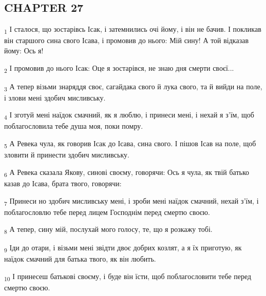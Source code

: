 \subsection{CHAPTER 27}
\begin{tcolorbox}
\textsubscript{1} І сталося, що зостарівсь Ісак, і затемнились очі йому, і він не бачив. І покликав він старшого сина свого Ісава, і промовив до нього: Мій сину! А той відказав йому: Ось я!
\end{tcolorbox}
\begin{tcolorbox}
\textsubscript{2} І промовив до нього Ісак: Оце я зостарівся, не знаю дня смерти своєї...
\end{tcolorbox}
\begin{tcolorbox}
\textsubscript{3} А тепер візьми знаряддя своє, сагайдака свого й лука свого, та й вийди на поле, і злови мені здобич мисливську.
\end{tcolorbox}
\begin{tcolorbox}
\textsubscript{4} І зготуй мені наїдок смачний, як я люблю, і принеси мені, і нехай я з'їм, щоб поблагословила тебе душа моя, поки помру.
\end{tcolorbox}
\begin{tcolorbox}
\textsubscript{5} А Ревека чула, як говорив Ісак до Ісава, сина свого. І пішов Ісав на поле, щоб зловити й принести здобич мисливську.
\end{tcolorbox}
\begin{tcolorbox}
\textsubscript{6} А Ревека сказала Якову, синові своєму, говорячи: Ось я чула, як твій батько казав до Ісава, брата твого, говорячи:
\end{tcolorbox}
\begin{tcolorbox}
\textsubscript{7} Принеси но здобич мисливську мені, і зроби мені наїдок смачний, нехай з'їм, і поблагословлю тебе перед лицем Господнім перед смертю своєю.
\end{tcolorbox}
\begin{tcolorbox}
\textsubscript{8} А тепер, сину мій, послухай мого голосу, те, що я розкажу тобі.
\end{tcolorbox}
\begin{tcolorbox}
\textsubscript{9} Іди до отари, і візьми мені звідти двоє добрих козлят, а я їх приготую, як наїдок смачний для батька твого, як він любить.
\end{tcolorbox}
\begin{tcolorbox}
\textsubscript{10} І принесеш батькові своєму, і буде він їсти, щоб поблагословити тебе перед смертю своєю.
\end{tcolorbox}
